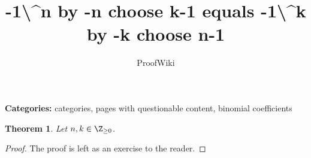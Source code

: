 \documentclass{article}
\title{-1\textbackslash{}^{}n by -n choose k-1 equals -1\textbackslash{}^{}k by -k choose n-1}
\author{ProofWiki}
\date{}
\newtheorem{theorem}{Theorem}
\begin{document}
\maketitle

\noindent\textbf{Categories:} categories, pages with questionable content, binomial coefficients

\begin{theorem}
Let $n, k \in \Z_{\ge 0}$.
\end{theorem}

\begin{proof}
The proof is left as an exercise to the reader.
\end{proof}
\end{document}
